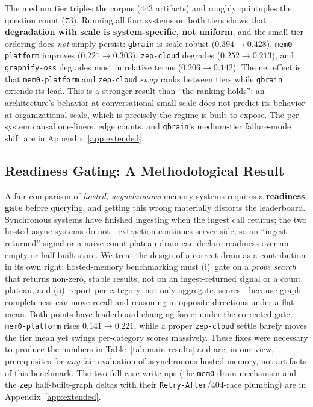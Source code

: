 The medium tier triples the corpus ($443$ artifacts) and roughly quintuples the
question count ($73$). Running all four systems on both tiers shows that
\textbf{degradation with scale is system-specific, not uniform}, and the
small-tier ordering does \emph{not} simply persist: \texttt{gbrain} is
scale-robust ($0.394 \rightarrow 0.428$), \texttt{mem0-platform} improves
($0.221 \rightarrow 0.303$), \texttt{zep-cloud} degrades ($0.252 \rightarrow
0.213$), and \texttt{graphify-oss} degrades most in relative terms ($0.206
\rightarrow 0.142$). The net effect is that \texttt{mem0-platform} and
\texttt{zep-cloud} \emph{swap} ranks between tiers while \texttt{gbrain} extends
its lead. This is a stronger result than ``the ranking holds'': an architecture's
behavior at conversational small scale does not predict its behavior at
organizational scale, which is precisely the regime \bench{} is built to expose.
The per-system causal one-liners, edge counts, and \texttt{gbrain}'s medium-tier
failure-mode shift are in Appendix~\ref{app:extended}.

\subsection{Readiness Gating: A Methodological Result}
\label{sec:exp:readiness}

A fair comparison of \emph{hosted, asynchronous} memory systems requires a
\textbf{readiness gate} before querying, and getting this wrong materially
distorts the leaderboard. Synchronous systems have finished ingesting when the
ingest call returns; the two hosted async systems do not---extraction continues
server-side, so an ``ingest returned'' signal or a naive count-plateau drain can
declare readiness over an empty or half-built store. We treat the design of a
correct drain as a contribution in its own right: hosted-memory benchmarking must
(i)~gate on a \emph{probe search} that returns non-zero, stable results, not on an
ingest-returned signal or a count plateau, and (ii)~report per-category, not only
aggregate, scores---because graph completeness can move recall and reasoning in
opposite directions under a flat mean. Both points have leaderboard-changing
force: under the corrected gate \texttt{mem0-platform} rises $0.141 \rightarrow
0.221$, while a proper \texttt{zep-cloud} settle barely moves the tier mean yet
swings per-category scores massively. These fixes were necessary to produce the
numbers in Table~\ref{tab:main-results} and are, in our view, prerequisites for
\emph{any} fair evaluation of asynchronous hosted memory, not artifacts of this
benchmark. The two full case write-ups (the \texttt{mem0} drain mechanism and the
\texttt{zep} half-built-graph deltas with their \texttt{Retry-After}/404-race
plumbing) are in Appendix~\ref{app:extended}.
